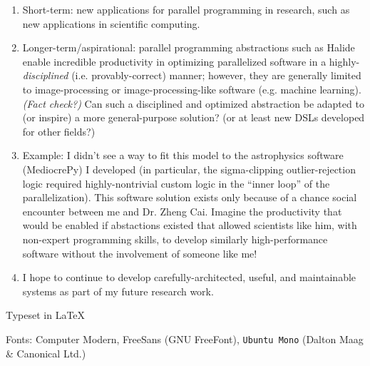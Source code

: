\documentclass[11pt]{article}
\begin{document}
\begin{enumerate}
\item Short-term: new applications for parallel programming in
  research, such as new applications in scientific computing.
\item Longer-term/aspirational: parallel programming abstractions such
  as Halide enable incredible productivity in optimizing parallelized
  software in a highly-\textit{disciplined} (i.e. provably-correct)
  manner; however, they are generally limited to image-processing or
  image-processing-like software (e.g. machine
  learning). \textit{(Fact check?)} Can such a disciplined and
  optimized abstraction be adapted to (or inspire) a more
  general-purpose solution? (or at least new DSLs developed for other
  fields?)
\item Example: I didn't see a way to fit this model to the
  astrophysics software (MediocrePy) I developed (in particular, the
  sigma-clipping outlier-rejection logic required highly-nontrivial
  custom logic in the ``inner loop'' of the parallelization). This
  software solution exists only because of a chance social encounter
  between me and Dr. Zheng Cai. Imagine the productivity that would be
  enabled if abstactions existed that allowed scientists like him,
  with non-expert programming skills, to develop similarly
  high-performance software without the involvement of someone like
  me!
\item I hope to continue to develop carefully-architected, useful, and
  maintainable systems as part of my future research work.
\end{enumerate}

{
\vfill
\begin{center}
\color{gray}
Typeset in \LaTeX\

Fonts: Computer Modern, \textsf{FreeSans} (GNU FreeFont),
\texttt{Ubuntu Mono} (Dalton Maag \& Canonical Ltd.)
\end{center}
}
\end{document}
